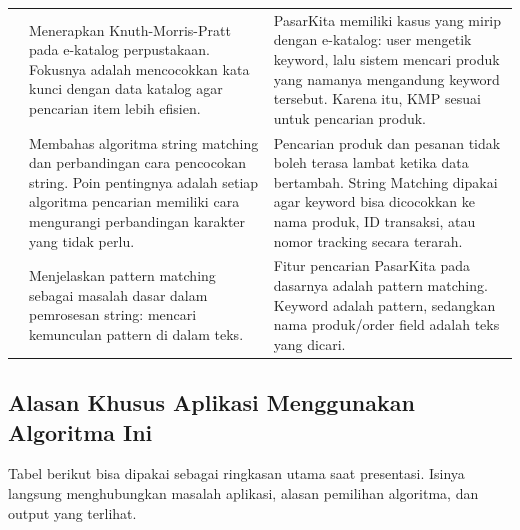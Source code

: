 \begin{longtable}{@{} >{\raggedright\arraybackslash}p{} >{\raggedright\arraybackslash}p{} >{\raggedright\arraybackslash}p{} @{}}
    \addlinespace
    \textcite{Marbun2024} & Menerapkan Knuth-Morris-Pratt pada e-katalog perpustakaan. Fokusnya adalah mencocokkan kata kunci dengan data katalog agar pencarian item lebih efisien. & PasarKita memiliki kasus yang mirip dengan e-katalog: user mengetik keyword, lalu sistem mencari produk yang namanya mengandung keyword tersebut. Karena itu, KMP sesuai untuk pencarian produk. \\
    \addlinespace
    \textcite{Al-howaide} & Membahas algoritma string matching dan perbandingan cara pencocokan string. Poin pentingnya adalah setiap algoritma pencarian memiliki cara mengurangi perbandingan karakter yang tidak perlu. & Pencarian produk dan pesanan tidak boleh terasa lambat ketika data bertambah. String Matching dipakai agar keyword bisa dicocokkan ke nama produk, ID transaksi, atau nomor tracking secara terarah. \\
    \addlinespace
    \textcite{Crochemore2013} & Menjelaskan pattern matching sebagai masalah dasar dalam pemrosesan string: mencari kemunculan pattern di dalam teks. & Fitur pencarian PasarKita pada dasarnya adalah pattern matching. Keyword adalah pattern, sedangkan nama produk/order field adalah teks yang dicari. \\
\end{longtable}
\endgroup

\subsection{Alasan Khusus Aplikasi Menggunakan Algoritma Ini}

Tabel berikut bisa dipakai sebagai ringkasan utama saat presentasi. Isinya langsung menghubungkan masalah aplikasi, alasan pemilihan algoritma, dan output yang terlihat.

